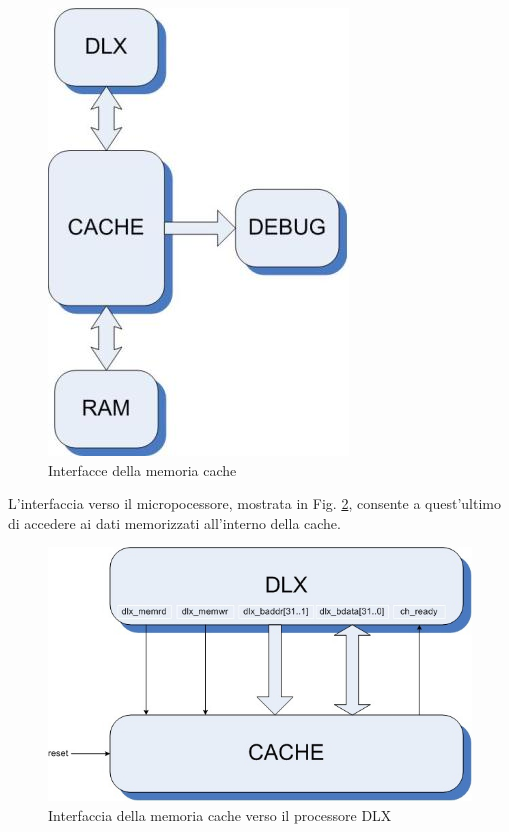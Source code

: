 \begin{figure}[!h]
 \centering
\includegraphics{img/01-interfacce_schema_generale.jpg}
 \caption{Interfacce della memoria cache}
 \label{fig:int_gen}
\end{figure}


L'interfaccia verso il micropocessore, mostrata in Fig. \ref{fig:int_dlx}, consente a quest'ultimo di accedere ai dati memorizzati all'interno della cache. 

\begin{figure}[!h]
\centering
\includegraphics[width=\textwidth]{img/dlx-cache.jpg}
\caption{Interfaccia della memoria cache verso il processore DLX}
\label{fig:int_dlx}
\end{figure}


